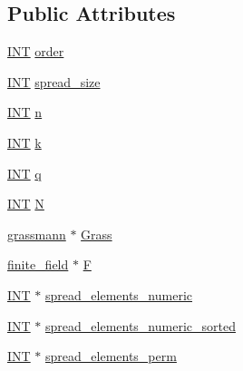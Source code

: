 \subsection*{Public Attributes}
\begin{DoxyCompactItemize}
\item 
\mbox{\hyperlink{galois_8h_a09fddde158a3a20bd2dcadb609de11dc}{I\+NT}} \mbox{\hyperlink{classandre__construction_ab168cfcaa6917dc10a4b6c52a10155a9}{order}}
\item 
\mbox{\hyperlink{galois_8h_a09fddde158a3a20bd2dcadb609de11dc}{I\+NT}} \mbox{\hyperlink{classandre__construction_a033f0cb9c8750378cc60d0bbfd696b70}{spread\+\_\+size}}
\item 
\mbox{\hyperlink{galois_8h_a09fddde158a3a20bd2dcadb609de11dc}{I\+NT}} \mbox{\hyperlink{classandre__construction_a35a2b68123bc0a07264d371850027418}{n}}
\item 
\mbox{\hyperlink{galois_8h_a09fddde158a3a20bd2dcadb609de11dc}{I\+NT}} \mbox{\hyperlink{classandre__construction_a30e383b93e247758866cebd5827818dd}{k}}
\item 
\mbox{\hyperlink{galois_8h_a09fddde158a3a20bd2dcadb609de11dc}{I\+NT}} \mbox{\hyperlink{classandre__construction_a58fa5d908359472639a17b39325ef77f}{q}}
\item 
\mbox{\hyperlink{galois_8h_a09fddde158a3a20bd2dcadb609de11dc}{I\+NT}} \mbox{\hyperlink{classandre__construction_ac0f1ce52605fd8fb60f703436598435e}{N}}
\item 
\mbox{\hyperlink{classgrassmann}{grassmann}} $\ast$ \mbox{\hyperlink{classandre__construction_a7525b1c772f87092e310e0c91d73acf3}{Grass}}
\item 
\mbox{\hyperlink{classfinite__field}{finite\+\_\+field}} $\ast$ \mbox{\hyperlink{classandre__construction_abb83384644c7629b70e6ea85a8f698c2}{F}}
\item 
\mbox{\hyperlink{galois_8h_a09fddde158a3a20bd2dcadb609de11dc}{I\+NT}} $\ast$ \mbox{\hyperlink{classandre__construction_ad3bedb4030db5922d2fc4d4834c9758c}{spread\+\_\+elements\+\_\+numeric}}
\item 
\mbox{\hyperlink{galois_8h_a09fddde158a3a20bd2dcadb609de11dc}{I\+NT}} $\ast$ \mbox{\hyperlink{classandre__construction_af0fad08490588b584e33a26b090d4318}{spread\+\_\+elements\+\_\+numeric\+\_\+sorted}}
\item 
\mbox{\hyperlink{galois_8h_a09fddde158a3a20bd2dcadb609de11dc}{I\+NT}} $\ast$ \mbox{\hyperlink{classandre__construction_afb9a05408bd011343e97c3264f1c115d}{spread\+\_\+elements\+\_\+perm}}
\item 

\end{DoxyCompactItemize}
